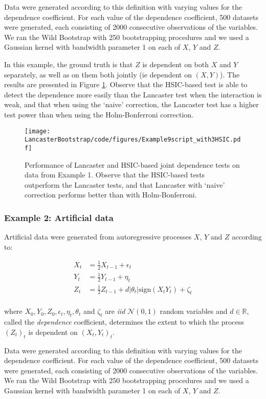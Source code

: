 \documentclass[12pt]{article}
\numberwithin{claim}{section}
\numberwithin{lemma}{section}
\numberwithin{theorem}{section}
\begin{document}
Data were generated according to this definition with varying values for the dependence coefficient. For each value of the dependence coefficient, 500 datasets were generated, each consisting of 2000 consecutive observations of the variables. We ran the Wild Bootstrap with 250 bootstrapping procedures and we used a Gaussian kernel with bandwidth parameter 1 on each of $X$, $Y$ and $Z$.

In this example, the ground truth is that $Z$ is dependent on both $X$ and $Y$ separately, as well as on them both jointly (ie dependent on $(X,Y)$). The results are presented in Figure \ref{fig:ex1}. Observe that the HSIC-based test is able to detect the dependence more easily than the Lancaster test when the interaction is weak, and that when using the `naive' correction, the Lancaster test has a higher test power than when using the Holm-Bonferroni correction.


\begin{figure}[htbp]
  \centering
  \texttt{[image: LancasterBootstrap/code/figures/Example9script\_with3HSIC.pdf]}
  \caption{Performance of Lancaster and HSIC-based joint dependence tests on data from Example 1. Observe that the HSIC-based tests outperform the Lancaster tests, and that Lancaster with `naive' correction performs better than with Holm-Bonferroni.}
  \label{fig:ex1}
\end{figure}

\subsubsection{Example 2: Artificial data}
Artificial data were generated from autoregressive processes $X$, $Y$ and $Z$ according to:

\begin{align*}
X_t &= \frac{1}{2}X_{t-1} + \epsilon_t\\
Y_t &= \frac{1}{2}Y_{t-1} + \eta_t\\
Z_t &= \frac{1}{2}Z_{t-1} + d |\theta_t|\text{sign}(X_t Y_t) + \zeta_t\\
\end{align*}

where $X_0, Y_0, Z_0, \epsilon_t, \eta_t, \theta_t$ and $\zeta_t$ are \emph{iid} $\mathcal{N}(0,1)$ random variables and $d\in\mathbb{R}$, called the \emph{dependence} coefficient, determines the extent to which the process $(Z_t)_t$ is dependent on $(X_t,Y_t)_t$.

Data were generated according to this definition with varying values for the dependence coefficient. For each value of the dependence coefficient, 500 datasets were generated, each consisting of 2000 consecutive observations of the variables. We ran the Wild Bootstrap with 250 bootstrapping procedures and we used a Gaussian kernel with bandwidth parameter 1 on each of $X$, $Y$ and $Z$.
\end{document}
